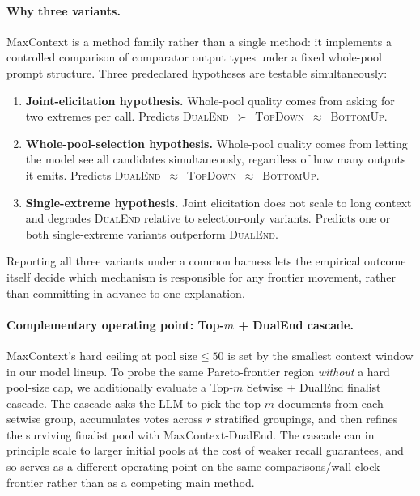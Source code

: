 \paragraph{Why three variants.} MaxContext is a method family rather than a
single method: it implements a controlled comparison of comparator output
types under a fixed whole-pool prompt structure. Three predeclared hypotheses
are testable simultaneously:
\begin{enumerate}
\item \textbf{Joint-elicitation hypothesis.} Whole-pool quality comes from
  asking for two extremes per call. Predicts
  \textsc{DualEnd}~$\succ$~\textsc{TopDown}~$\approx$~\textsc{BottomUp}.
\item \textbf{Whole-pool-selection hypothesis.} Whole-pool quality comes from
  letting the model see all candidates simultaneously, regardless of how many
  outputs it emits. Predicts
  \textsc{DualEnd}~$\approx$~\textsc{TopDown}~$\approx$~\textsc{BottomUp}.
\item \textbf{Single-extreme hypothesis.} Joint elicitation does not scale to
  long context and degrades \textsc{DualEnd} relative to selection-only
  variants. Predicts one or both single-extreme variants outperform
  \textsc{DualEnd}.
\end{enumerate}
Reporting all three variants under a common harness lets the empirical
outcome itself decide which mechanism is responsible for any frontier
movement, rather than committing in advance to one explanation.

\paragraph{Complementary operating point: Top-$m$ + DualEnd cascade.}
MaxContext's hard ceiling at $\text{pool size}\le 50$ is set by the smallest
context window in our model lineup. To probe the same Pareto-frontier region
\emph{without} a hard pool-size cap, we additionally evaluate a Top-$m$
Setwise + DualEnd finalist cascade. The cascade asks the LLM to pick the
top-$m$ documents from each setwise group, accumulates votes across $r$
stratified groupings, and then refines the surviving finalist pool with
MaxContext-DualEnd. The cascade can in principle scale to larger initial
pools at the cost of weaker recall guarantees, and so serves as a different
operating point on the same comparisons/wall-clock frontier rather than as a
competing main method.

